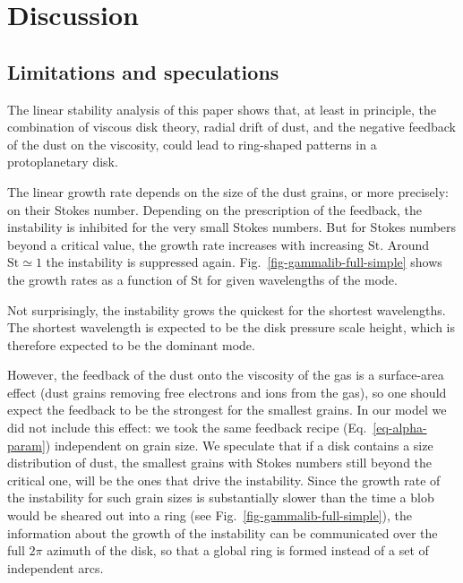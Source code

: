 \documentclass{aa}
\begin{document}
\section{Discussion}
\label{sec-discussion}
%
\subsection{Limitations and speculations}
The linear stability analysis of this paper shows that, at least in principle,
the combination of viscous disk theory, radial drift of dust, and the negative
feedback of the dust on the viscosity, could lead to ring-shaped patterns in a
protoplanetary disk.

The linear growth rate depends on the size of the dust grains, or more
precisely: on their Stokes number. Depending on the prescription of the
feedback, the instability is inhibited for the very small Stokes numbers.  But
for Stokes numbers beyond a critical value, the growth rate increases with
increasing $\mathrm{St}$. Around $\mathrm{St}\simeq 1$ the instability is
suppressed again. Fig.~\ref{fig-gammalib-full-simple} shows the growth rates as
a function of $\mathrm{St}$ for given wavelengths of the mode.

Not surprisingly, the instability grows the quickest for the shortest wavelengths.
The shortest wavelength is expected to be the disk pressure scale height, which is
therefore expected to be the dominant mode.

However, the feedback of the dust onto the viscosity of the gas is a
surface-area effect (dust grains removing free electrons and ions from the gas),
so one should expect the feedback to be the strongest for the smallest
grains. In our model we did not include this effect: we took the same feedback
recipe (Eq.~\ref{eq-alpha-param}) independent on grain size. We 
speculate that if a disk contains a size distribution of dust, the smallest
grains with Stokes numbers still beyond the critical one, will be the ones
that drive the instability. Since the growth rate of the instability for such
grain sizes is substantially slower than the time a blob would be sheared out
into a ring (see Fig.~\ref{fig-gammalib-full-simple}), the information about the
growth of the instability can be communicated over the full $2\pi$ azimuth of
the disk, so that a global ring is formed instead of a set of independent arcs.
\end{document}
